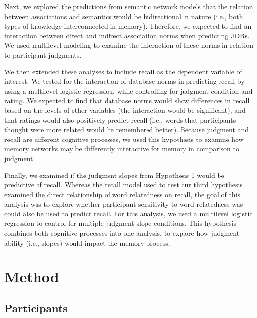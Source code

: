\documentclass[english,,man]{apa6}
\begin{document}
Next, we explored the predictions from semantic network models that the relation between associations and semantics would be bidirectional in nature (i.e., both types of knowledge interconnected in memory). Therefore, we expected to find an interaction between direct and indirect association norms when predicting JORs. We used multilevel modeling to examine the interaction of these norms in relation to participant judgments.

We then extended these analyses to include recall as the dependent variable of interest. We tested for the interaction of database norms in predicting recall by using a multilevel logistic regression, while controlling for judgment condition and rating. We expected to find that database norms would show differences in recall based on the levels of other variables (the interaction would be significant), and that ratings would also positively predict recall (i.e., words that participants thought were more related would be remembered better). Because judgment and recall are different cognitive processes, we used this hypothesis to examine how memory networks may be differently interactive for memory in comparison to judgment.

Finally, we examined if the judgment slopes from Hypothesis 1 would be predictive of recall. Whereas the recall model used to test our third hypothesis examined the direct relationship of word relatedness on recall, the goal of this analysis was to explore whether participant sensitivity to word relatedness was could also be used to predict recall. For this analysis, we used a multilevel logistic regression to control for multiple judgment slope conditions. This hypothesis combines both cognitive processes into one analysis, to explore how judgment ability (i.e., slopes) would impact the memory process.

\hypertarget{method}{%
\section{Method}\label{method}}

\hypertarget{participants}{%
\subsection{Participants}\label{participants}}
\end{document}
